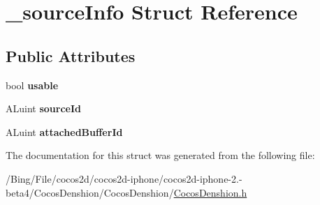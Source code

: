 \hypertarget{struct__source_info}{\section{\-\_\-source\-Info Struct Reference}
\label{struct__source_info}
}
\subsection*{Public Attributes}
\begin{DoxyCompactItemize}
\item 
\hypertarget{struct__source_info_a22f8eac8d5bdaf3f588680221397c387}{bool {\bfseries usable}}\label{struct__source_info_a22f8eac8d5bdaf3f588680221397c387}

\item 
\hypertarget{struct__source_info_a23e87c0ede21db9523ed5e8464556ea8}{A\-Luint {\bfseries source\-Id}}\label{struct__source_info_a23e87c0ede21db9523ed5e8464556ea8}

\item 
\hypertarget{struct__source_info_a377ad6280a2b4a01f996118324431259}{A\-Luint {\bfseries attached\-Buffer\-Id}}\label{struct__source_info_a377ad6280a2b4a01f996118324431259}

\end{DoxyCompactItemize}


The documentation for this struct was generated from the following file\-:\begin{DoxyCompactItemize}
\item 
/\-Bing/\-File/cocos2d/cocos2d-\/iphone/cocos2d-\/iphone-\/2.-\/beta4/\-Cocos\-Denshion/\-Cocos\-Denshion/\hyperlink{_cocos_denshion_8h}{Cocos\-Denshion.\-h}\end{DoxyCompactItemize}
